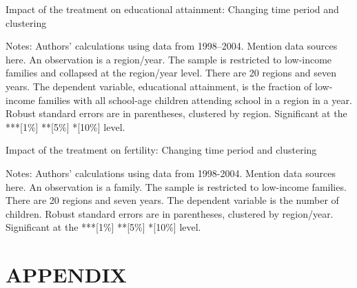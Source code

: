\documentclass[12pt,a4paper]{article}
\begin{document}
\begin{footnotesize}
\begin{table}[H]
   \centering
   \caption{Impact of the treatment on educational attainment: Changing time period and clustering} \label{tab:table6}
   \begin{threeparttable}
         \footnotesize 
     
        \begin{tablenotes}
        \scriptsize 
        \item{Notes: Authors’ calculations using data from 1998--2004. Mention data sources here. An observation is a region/year. The sample is restricted to low-income families and collapsed at the region/year level. There are 20 regions and seven years. The dependent variable, educational attainment, is the fraction of low-income families with all school-age children attending school in a region in a year. Robust standard errors are in parentheses, clustered by region. Significant at the ***[1\%] **[5\%] *[10\%] level.
}
        \end{tablenotes}  
   \end{threeparttable}                          
\end{table}

\begin{table}[H]
   \centering
   \caption{Impact of the treatment on fertility: Changing time period and clustering} \label{tab:table7}
   \begin{threeparttable}
         \footnotesize 
     
        \begin{tablenotes}
        \scriptsize 
        \item{Notes: Authors’ calculations using data from 1998-2004. Mention data sources here. An observation is a family. The sample is restricted to low-income families. There are 20 regions and seven years. The dependent variable is the number of children. Robust standard errors are in parentheses, clustered by region/year. Significant at the ***[1\%] **[5\%] *[10\%] level.
}
        \end{tablenotes}  
   \end{threeparttable}                          
\end{table}

\end{footnotesize}

\newpage
\section{APPENDIX}
\end{document}
